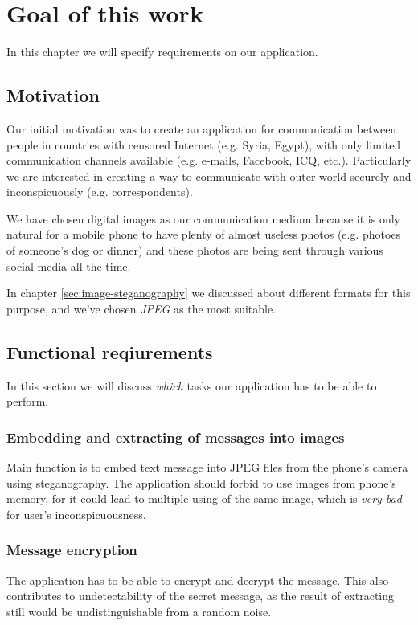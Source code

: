 \chapter{Goal of this work}

In this chapter we will specify requirements on our application.

\section{Motivation}

Our initial motivation was to create an application for communication between
people in countries with censored Internet (e.g. Syria, Egypt), with only limited communication channels
available (e.g. e-mails, Facebook, ICQ, etc.). Particularly we are interested in
creating a way to communicate with outer world securely and inconspicuously 
(e.g. correspondents).

We have chosen digital images as our communication medium because it is only natural for
a mobile phone to have plenty of almost useless photos (e.g. photoes of someone's dog or dinner)
and these photos are being sent through various social media all the time.

In chapter \ref{sec:image-steganography} we discussed about different formats for
this purpose, and we've chosen \emph{JPEG} as the most suitable.

\section{Functional reqiurements}
In this section we will discuss \emph{which} tasks our application has to be able to perform.

\subsection{Embedding and extracting of messages into images}
Main function is to embed text message into JPEG files from the phone's camera using steganography.
The application should forbid to use images from phone's memory, for it could lead to multiple 
using of the same image, which is \emph{very bad} for user's inconspicuousness.

\subsection{Message encryption}
The application has to be able to encrypt and decrypt the message. This also contributes
to undetectability of the secret message, as the result of extracting still would be 
undistinguishable from a random noise.


